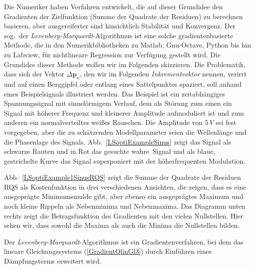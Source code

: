 Die Numeriker haben Verfahren entwickelt, die auf dieser Grundidee den Gradienten
der Zielfunktion (Summe der Quadrate der Residuen) zu berechnen
basieren, aber ausgereiferter sind hinsichtlich Stabilität und Konvergenz.
Der sog.\ der \textsl{Levenberg-Marquardt}-Algorithmus ist eine solche gradientenbasierte Methode,
die in den Numerikbibliotheken zu Matlab, Gnu-Octave, Python bis hin zu Labview, für nichtlineare
Regression zur Verfügung gestellt wird. Die Grundidee dieser Methode wollen wir im Folgenden skizzieren.
Die Problematik, dass sich der Vektor $\Delta \mathbf{p}_{\kappa}$, den wir im
Folgenden \textsl{Inkrementvektor} nennen, verirrt und auf
einen Berggipfel oder entlang eines Sattelpunktes spaziert, soll anhand eines Beispielsignals
illustriert werden. Das Beispiel ist ein zeitabhängiges Spannungssignal mit sinusförmigem Verlauf,
dem als Störung zum einen ein Signal mit höherer Frequenz und kleinerer Amplitude aufmoduliert ist
und zum anderen ein normalverteiltes weißes Rauschen.
Die Amplitude von $5 \, V$ sei fest vorgegeben, aber die zu schätzenden Modellparameter seien
die Wellenlänge und die Phasenlage des Signals. Abb.~\ref{LSoptiExampleSinus} zeigt das Signal als
schwarze Rauten und in Rot das gesuchte \glqq wahre\grqq ~Signal und als blaue, gestrichelte Kurve
das Signal superponiert mit der höherfrequenten Modulation.

Abb.~\ref{LSoptiExample1SinusRQS} zeigt die Summe der Quadrate der Residuen RQS als
Kostenfunktion in drei verschiedenen Ansichten, die zeigen, dass es eine ausgeprägte Minimumsmulde gibt,
aber ebenso ein ausgeprägtes Maximum und noch kleine Rippeln als Nebenminima und Nebenmaxima.
Das Diagramm unten rechts zeigt die Betragsfunktion des Gradienten mit den vielen Nullstellen.
Hier sehen wir, dass sowohl die Maxima als auch die Minima die Nullstellen bilden.

Der \textsl{Levenberg-Marquardt}-Algorithmus ist ein Gradientenverfahren, bei dem das lineare
Gleichungssystems (\ref{GradientQlinGl3})
durch Einführen eines Dämpfungsterms erweitert wird.

